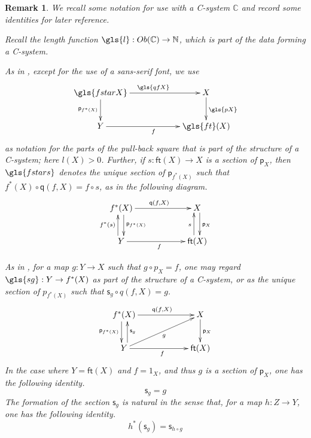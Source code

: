 \documentclass[12pt]{article}
\numberwithin{equation}{section}
\newenvironment{eq}{\begin{equation}}{\end{equation}}
\newtheorem{remark}[proposition]{Remark}
\newcommand{\sr}{\rightarrow}
\newcommand{\NN}{{\mathbb N}}
\newcommand{\CC}{{\mathbb C}}  %
\newcommand{\ft}{\mathsf{ft}}
\newcommand{\p}{\mathsf{p}}
\newcommand{\q}{\mathsf{q}}
\newcommand{\s}{\mathsf{s}}     %
\newcommand{\Ob}{Ob}
\begin{document}
\begin{remark}
  We recall some notation for use with a C-system $\CC$ and record some identities for later reference.

  Recall the length function $\gls{l} : \Ob(\CC) \to \NN$, which is part of the data forming a C-system.


  As in \cite[Def.~2.1 and Prop.~2.4]{Csubsystems}, except for the use of a sans-serif font, we use
  \begin{eq}
    \label{qfX-diag}
    \xymatrix@C=5pc{
      \gls{fstarX} \ar[r]^{\gls{qfX}} \ar[d]_{\p_{f^*(X)}}  & X \ar[d]^{\gls{pX}} \\
      Y \ar[r]_f & \gls{ft}(X)
    }
  \end{eq}%
  as notation for the parts of the pull-back square that is part of the
  structure of a C-system; here $l(X) > 0$.
  Further, if $s : \ft(X) \sr X$ is a section of $\p_X$, then $\gls{fstars}$ denotes
  the unique section of $\p_{f^*(X)}$ such that $f^*(X) \circ \q(f,X) = f \circ
  s$, as in the following diagram.
  \begin{eq}
    \xymatrix@C=5pc{
      f^*(X) \ar[r]^{\q(f,X)} \ar@<3pt>[d]^{\p_{f^*(X)}}  & X \ar@<3pt>[d]^{\p_X} \\
      Y \ar[r]_f \ar@<4pt>[u]^{f^*(s)} & \ft(X) \ar@<4pt>[u]^s
    }
  \end{eq}%

  As in \cite[Def.~2.3 and Prop.~2.4]{Csubsystems}, for a map $g : Y \sr X$
  such that $g \circ p_X = f$, one may regard
  $\gls{sg} : Y \sr f^*(X)$ as part of the structure of a C-system, or
  as the unique section of $p_{f^*(X)}$ such that $\s_g \circ q(f,X) = g$.
  \begin{eq}
    \xymatrix@C=5pc{
      f^*(X) \ar[r]^{\q(f,X)} \ar@<-3pt>[d]_{\p_{f^*(X)}} & X \ar[d]^{\p_X} \\
      Y \ar[ru]_g \ar[r]_f \ar@<-4pt>[u]_{\s_g} & \ft(X)
    }
  \end{eq}%
  In the case where $Y = \ft(X)$ and $f = 1_X$, and thus $g$ is a section of $\p_X$,
  one has the following identity.
  \begin{eq}
    \label{section-section}
    \s_g = g
  \end{eq}%
  The formation of the section $\s_g$ is natural in the sense that, for a map
  $h : Z \to Y$, one has the following identity.
  \begin{eq}
    \label{s-naturality}
    h^* (\s_g) = \s_{h \circ g}
  \end{eq}%


\end{remark}
\end{document}
